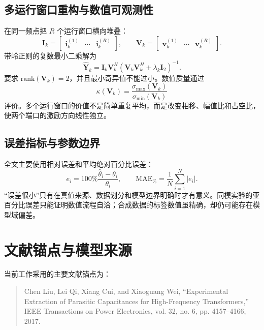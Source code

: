 \documentclass[UTF8,a4paper,12pt]{ctexart}
\begin{document}
\subsection{多运行窗口重构与数值可观测性}

在同一频点把 $R$ 个运行窗口横向堆叠：
\begin{equation}
\mathbf I_k=
\begin{bmatrix}\mathbf i_k^{(1)}&\cdots&\mathbf i_k^{(R)}\end{bmatrix},\qquad
\mathbf V_k=
\begin{bmatrix}\mathbf v_k^{(1)}&\cdots&\mathbf v_k^{(R)}\end{bmatrix}.
\end{equation}
带岭正则的复数最小二乘解为
\begin{equation}
\hat{\mathbf Y}_k=\mathbf I_k\mathbf V_k^{H}
\left(\mathbf V_k\mathbf V_k^{H}+\lambda_k\mathbf I_2\right)^{-1}.
\label{eq:y-reconstruction}
\end{equation}
要求 $\mathrm{rank}(\mathbf V_k)=2$，并且最小奇异值不能过小。数值质量通过
\begin{equation}
\kappa(\mathbf V_k)=\frac{\sigma_{\max}(\mathbf V_k)}{\sigma_{\min}(\mathbf V_k)}
\end{equation}
评价。多个运行窗口的价值不是简单重复平均，而是改变相移、幅值比和占空比，使两个端口的激励方向线性独立。

\subsection{误差指标与参数边界}

全文主要使用相对误差和平均绝对百分比误差：
\begin{equation}
e_i=100\%\frac{\hat\theta_i-\theta_i}{\theta_i},\qquad
\mathrm{MAE}_{\%}=\frac{1}{N}\sum_{i=1}^{N}|e_i|.
\end{equation}
“误差很小”只有在真值来源、数据划分和模型边界明确时才有意义。同模实验的亚百分比误差只能证明数值流程自洽；合成数据的标签数值虽精确，却仍可能存在模型域偏差。

\section{文献锚点与模型来源}

当前工作采用的主要文献锚点为：

\begin{quote}
Chen Liu, Lei Qi, Xiang Cui, and Xiaoguang Wei, ``Experimental Extraction of Parasitic Capacitances for High-Frequency Transformers,'' IEEE Transactions on Power Electronics, vol. 32, no. 6, pp. 4157--4166, 2017.
\end{quote}
\end{document}
